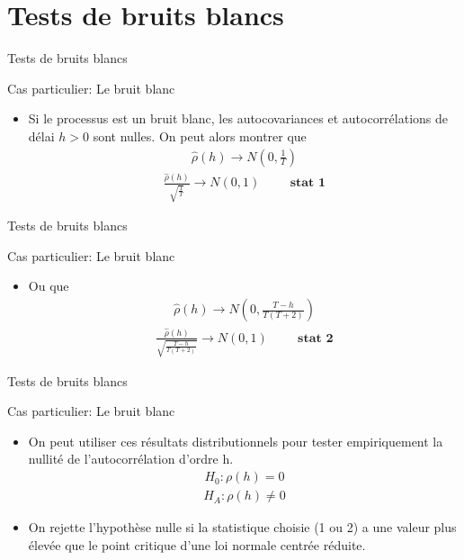 \documentclass{beamer}
\begin{document}
\section{Tests de bruits blancs}
\frame{\tableofcontents[current]}

\begin{frame}{Tests de bruits blancs}
\begin{block}{Cas particulier: Le bruit blanc}
\begin{itemize}
\item Si le processus est un bruit blanc, les autocovariances et autocorrélations de délai $h > 0$ sont nulles. On peut alors montrer que
\begin{align*}
\hat{\rho}(h) \rightarrow N \left(0,\frac{1}{T}\right)
\end{align*}
\begin{align*}
\frac{\hat{\rho}(h)}{\sqrt{\frac{1}{T}}} \rightarrow N(0,1) \hspace{1cm} \textbf{stat 1}
\end{align*}
\end{itemize}
\end{block}
\end{frame}

\begin{frame}{Tests de bruits blancs}
\begin{block}{Cas particulier: Le bruit blanc}
\begin{itemize}
\item Ou que 
\begin{align*}
\hat{\rho}(h) \rightarrow N \left(0,\frac{T-h}{T(T+2)}\right)
\end{align*}
\begin{align*}
\frac{\hat{\rho}(h)}{\sqrt{\frac{T-h}{T(T+2)}}} \rightarrow N(0,1)  \hspace{1cm} \textbf{stat 2}
\end{align*}
\end{itemize}
\end{block}
\end{frame}

\begin{frame}{Tests de bruits blancs}
\begin{block}{Cas particulier: Le bruit blanc}
\begin{itemize}
\item On peut utiliser ces résultats distributionnels pour tester empiriquement la nullité de l’autocorrélation d’ordre h.
\begin{align*}
H_0: \rho (h) = 0 
\end{align*}
\begin{align*}
H_A: \rho(h)\neq 0
\end{align*}
\item On rejette l’hypothèse nulle si la statistique choisie (1 ou 2) a une valeur plus élevée que le point critique d’une loi normale centrée réduite.
\end{itemize}
\end{block}
\end{frame}
\end{document}
